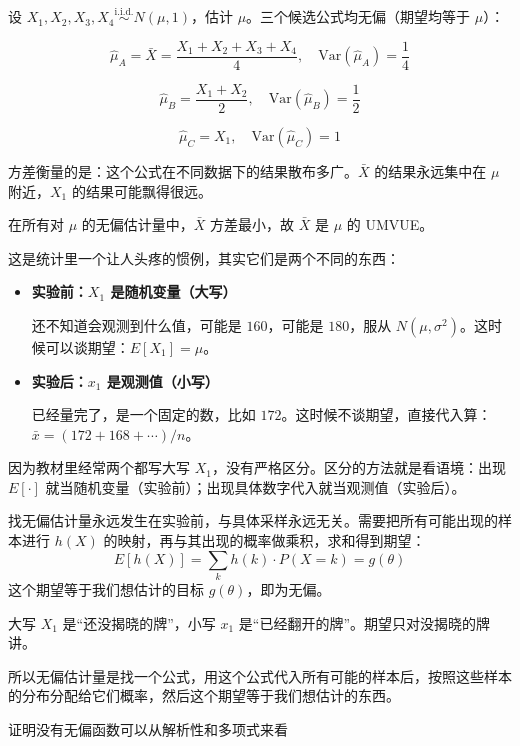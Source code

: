 \begin{example}
设 $X_1, X_2, X_3, X_4 \overset{\text{i.i.d.}}{\sim} N(\mu, 1)$，估计 $\mu$。三个候选公式均无偏（期望均等于 $\mu$）：

$$\hat{\mu}_A = \bar{X} = \frac{X_1+X_2+X_3+X_4}{4}, \quad \mathrm{Var}(\hat{\mu}_A) = \frac{1}{4}$$

$$\hat{\mu}_B = \frac{X_1+X_2}{2}, \quad \mathrm{Var}(\hat{\mu}_B) = \frac{1}{2}$$

$$\hat{\mu}_C = X_1, \quad \mathrm{Var}(\hat{\mu}_C) = 1$$

方差衡量的是：这个公式在不同数据下的结果散布多广。$\bar{X}$ 的结果永远集中在 $\mu$ 附近，$X_1$ 的结果可能飘得很远。

在所有对 $\mu$ 的无偏估计量中，$\bar{X}$ 方差最小，故 $\bar{X}$ 是 $\mu$ 的 UMVUE。
\end{example}
\begin{note}
    这是统计里一个让人头疼的惯例，其实它们是两个不同的东西：

\begin{itemize}
  \item \textbf{实验前：$X_1$ 是随机变量（大写）}
  
  还不知道会观测到什么值，可能是 $160$，可能是 $180$，服从 $N(\mu, \sigma^2)$。这时候可以谈期望：$E[X_1] = \mu$。

  \item \textbf{实验后：$x_1$ 是观测值（小写）}
  
  已经量完了，是一个固定的数，比如 $172$。这时候不谈期望，直接代入算：$\bar{x} = (172 + 168 + \cdots)/n$。
\end{itemize}

因为教材里经常两个都写大写 $X_1$，没有严格区分。区分的方法就是看语境：出现 $E[\cdot]$ 就当随机变量（实验前）；出现具体数字代入就当观测值（实验后）。


\end{note}
\begin{dxtips}
    找无偏估计量永远发生在实验前，与具体采样永远无关。需要把所有可能出现的样本进行 $h(X)$ 的映射，再与其出现的概率做乘积，求和得到期望：
$$E[h(X)] = \sum_k h(k) \cdot P(X=k) = g(\theta)$$
这个期望等于我们想估计的目标 $g(\theta)$，即为无偏。
\end{dxtips}
\begin{note}
大写 $X_1$ 是``还没揭晓的牌''，小写 $x_1$ 是``已经翻开的牌''。期望只对没揭晓的牌讲。
\end{note}
\begin{dxtips}
    

所以无偏估计量是找一个公式，用这个公式代入所有可能的样本后，按照这些样本的分布分配给它们概率，然后这个期望等于我们想估计的东西。
\end{dxtips}
\begin{dxtips}
    证明没有无偏函数可以从解析性和多项式来看
\end{dxtips}

